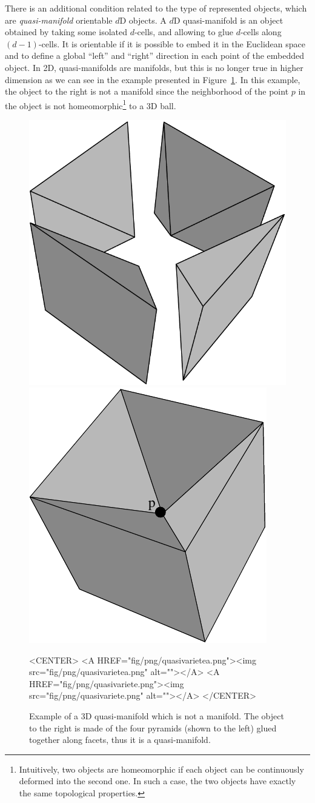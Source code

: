 There is an additional condition related to the type of represented
objects, which are \emph{quasi-manifold} orientable $d$D objects.  A
$d$D quasi-manifold is an object obtained by taking some isolated
$d$-cells, and allowing to glue $d$-cells along $(d-1)$-cells. It is
orientable if it is possible to embed it in the Euclidean space and to
define a global ``left'' and ``right'' direction in each point of the
embedded object.  In 2D, quasi-manifolds are manifolds, but this is no
longer true in higher dimension as we can see in the example presented
in Figure~\ref{fig-quasivariete}.  In this example, the object to the
right is not a manifold since the neighborhood of the point $p$ in the
object is not homeomorphic\footnote{Intuitively, two objects are
  homeomorphic if each object can be continuously deformed into the
  second one.  In such a case, the two objects have exactly the same
  topological properties.}  to a 3D ball.
%
\begin{figure}
  \begin{ccTexOnly}
    \begin{center}
    \includegraphics[width=.33\textwidth]{Combinatorial_map/fig/pdf/quasivarietea}
    \includegraphics[width=.33\textwidth]{Combinatorial_map/fig/pdf/quasivariete}
    \end{center}
  \end{ccTexOnly}
  \begin{ccHtmlOnly}
    <CENTER>
    <A HREF="fig/png/quasivarietea.png"><img src="fig/png/quasivarietea.png" alt=""></A>
    <A HREF="fig/png/quasivariete.png"><img src="fig/png/quasivariete.png" alt=""></A>
    </CENTER>
  \end{ccHtmlOnly} 
  \caption{Example of a 3D quasi-manifold which is not a manifold.
    The object to the right is made of the four pyramids (shown to the
    left) glued together along facets, thus it is a quasi-manifold.}
  \label{fig-quasivariete}
\end{figure}

